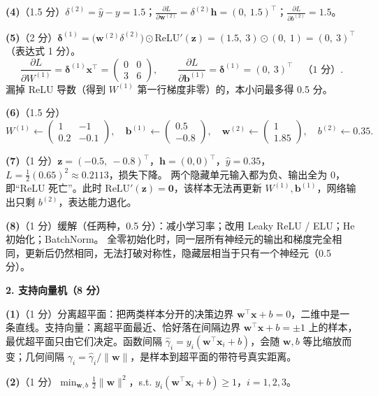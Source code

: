 \textbf{(4)}（1.5 分）$\delta^{(2)}=\hat y-y=1.5$；$\frac{\partial L}{\partial\bm w^{(2)}}=\delta^{(2)}\bm h=(0,\ 1.5)^\top$；$\frac{\partial L}{\partial b^{(2)}}=1.5$。

\textbf{(5)}（2 分）$\bm\delta^{(1)}=\big(\bm w^{(2)}\delta^{(2)}\big)\odot\mathrm{ReLU}'(\bm z)=(1.5,\ 3)\odot(0,\ 1)=(0,\ 3)^\top$（表达式 1 分）。
\[
\frac{\partial L}{\partial W^{(1)}}=\bm\delta^{(1)}\bm x^\top=\begin{pmatrix}0&0\\3&6\end{pmatrix},\qquad
\frac{\partial L}{\partial\bm b^{(1)}}=\bm\delta^{(1)}=(0,\ 3)^\top\quad\text{（1 分）}.
\]
漏掉 ReLU 导数（得到 $W^{(1)}$ 第一行梯度非零）的，本小问最多得 0.5 分。

\textbf{(6)}（1.5 分）
\[
W^{(1)}\leftarrow\begin{pmatrix}1&-1\\0.2&-0.1\end{pmatrix},\quad
\bm b^{(1)}\leftarrow\begin{pmatrix}0.5\\-0.8\end{pmatrix},\quad
\bm w^{(2)}\leftarrow\begin{pmatrix}1\\1.85\end{pmatrix},\quad b^{(2)}\leftarrow0.35 .
\]

\textbf{(7)}（1 分）$\bm z=(-0.5,\ -0.8)^\top$，$\bm h=(0,0)^\top$，$\hat y=0.35$，$L=\frac12(0.65)^2\approx0.2113$，损失下降。
两个隐藏单元输入都为负、输出全为 0，即“ReLU 死亡”。此时 $\mathrm{ReLU}'(\bm z)=\bm 0$，该样本无法再更新 $W^{(1)},\bm b^{(1)}$，网络输出只剩 $b^{(2)}$，表达能力退化。

\textbf{(8)}（1 分）缓解（任两种，0.5 分）：减小学习率；改用 Leaky ReLU / ELU；He 初始化；BatchNorm。
全零初始化时，同一层所有神经元的输出和梯度完全相同，更新后仍然相同，无法打破对称性，隐藏层相当于只有一个神经元（0.5 分）。

\medskip
\noindent\textbf{2. 支持向量机（8 分）}

\textbf{(1)}（1 分）分离超平面：把两类样本分开的决策边界 $\bm w^\top\bm x+b=0$，二维中是一条直线。支持向量：离超平面最近、恰好落在间隔边界 $\bm w^\top\bm x+b=\pm1$ 上的样本，最优超平面只由它们决定。函数间隔 $\hat\gamma_i=y_i(\bm w^\top\bm x_i+b)$，会随 $\bm w,b$ 等比缩放而变；几何间隔 $\gamma_i=\hat\gamma_i/\|\bm w\|$，是样本到超平面的带符号真实距离。

\textbf{(2)}（1 分）$\min_{\bm w,b}\frac12\|\bm w\|^2$，s.t. $y_i(\bm w^\top\bm x_i+b)\ge1$，$i=1,2,3$。

